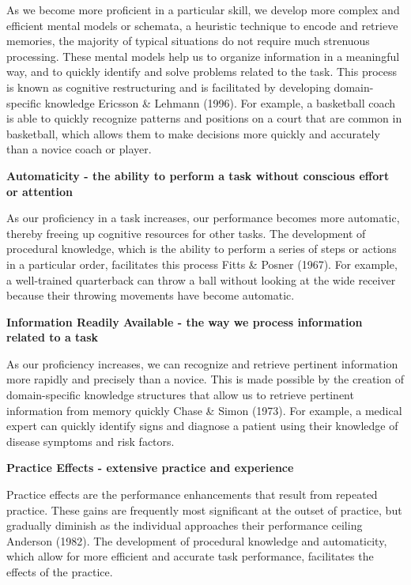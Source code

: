 \documentclass[print]{nuthesis}
\begin{document}
As we become more proficient in a particular skill, we develop more complex and efficient mental models or schemata, a heuristic technique to encode and retrieve memories, the majority of typical situations do not require much strenuous processing.
These mental models help us to organize information in a meaningful way, and to quickly identify and solve problems related to the task.
This process is known as cognitive restructuring and is facilitated by developing domain-specific knowledge Ericsson \& Lehmann (1996).
For example, a basketball coach is able to quickly recognize patterns and positions on a court that are common in basketball, which allows them to make decisions more quickly and accurately than a novice coach or player.

\textbf{Automaticity - the ability to perform a task without conscious effort or attention}

As our proficiency in a task increases, our performance becomes more automatic, thereby freeing up cognitive resources for other tasks.
The development of procedural knowledge, which is the ability to perform a series of steps or actions in a particular order, facilitates this process Fitts \& Posner (1967).
For example, a well-trained quarterback can throw a ball without looking at the wide receiver because their throwing movements have become automatic.

\textbf{Information Readily Available - the way we process information related to a task}

As our proficiency increases, we can recognize and retrieve pertinent information more rapidly and precisely than a novice.
This is made possible by the creation of domain-specific knowledge structures that allow us to retrieve pertinent information from memory quickly Chase \& Simon (1973).
For example, a medical expert can quickly identify signs and diagnose a patient using their knowledge of disease symptoms and risk factors.

\textbf{Practice Effects - extensive practice and experience}

Practice effects are the performance enhancements that result from repeated practice.
These gains are frequently most significant at the outset of practice, but gradually diminish as the individual approaches their performance ceiling Anderson (1982).
The development of procedural knowledge and automaticity, which allow for more efficient and accurate task performance, facilitates the effects of the practice.
\end{document}
